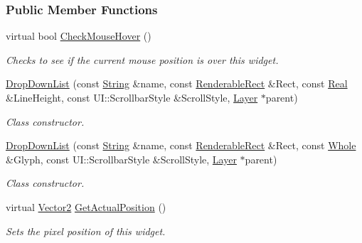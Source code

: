 \subsubsection*{Public Member Functions}
\begin{DoxyCompactItemize}
\item 
virtual bool \hyperlink{classphys_1_1UI_1_1DropDownList_a2ac515cb3282a0f190d002417e509424}{CheckMouseHover} ()
\begin{DoxyCompactList}\small\item\em Checks to see if the current mouse position is over this widget. \item\end{DoxyCompactList}\item 
\hyperlink{classphys_1_1UI_1_1DropDownList_a4646bc366b489a131747ea01629af428}{DropDownList} (const \hyperlink{namespacephys_aa03900411993de7fbfec4789bc1d392e}{String} \&name, const \hyperlink{structphys_1_1UI_1_1RenderableRect}{RenderableRect} \&Rect, const \hyperlink{namespacephys_af7eb897198d265b8e868f45240230d5f}{Real} \&LineHeight, const UI::ScrollbarStyle \&ScrollStyle, \hyperlink{classphys_1_1UI_1_1Layer}{Layer} $\ast$parent)
\begin{DoxyCompactList}\small\item\em Class constructor. \item\end{DoxyCompactList}\item 
\hyperlink{classphys_1_1UI_1_1DropDownList_a9868ebcc629cf6b43a3913be5358e0b8}{DropDownList} (const \hyperlink{namespacephys_aa03900411993de7fbfec4789bc1d392e}{String} \&name, const \hyperlink{structphys_1_1UI_1_1RenderableRect}{RenderableRect} \&Rect, const \hyperlink{namespacephys_a460f6bc24c8dd347b05e0366ae34f34a}{Whole} \&Glyph, const UI::ScrollbarStyle \&ScrollStyle, \hyperlink{classphys_1_1UI_1_1Layer}{Layer} $\ast$parent)
\begin{DoxyCompactList}\small\item\em Class constructor. \item\end{DoxyCompactList}\item 
virtual \hyperlink{classphys_1_1Vector2}{Vector2} \hyperlink{classphys_1_1UI_1_1DropDownList_a2c3b3dc073aebecd9216fa48e7cc10f2}{GetActualPosition} ()
\begin{DoxyCompactList}\small\item\em Sets the pixel position of this widget. \item\end{DoxyCompactList}\item 

\end{DoxyCompactItemize}
